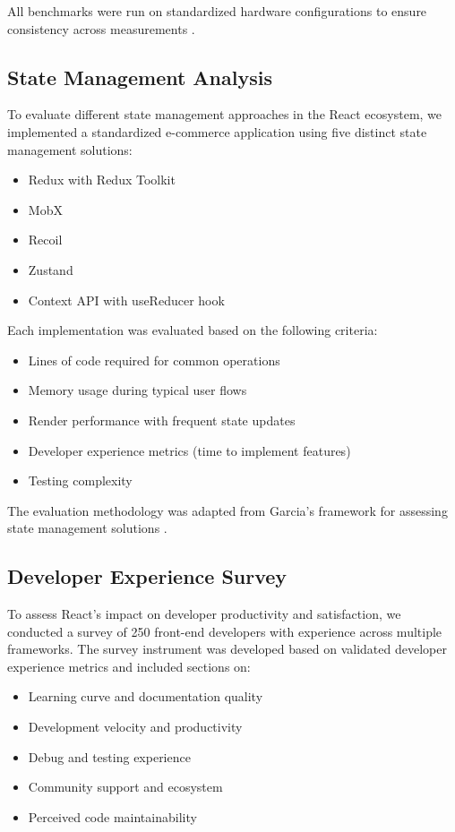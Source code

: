 All benchmarks were run on standardized hardware configurations to ensure consistency across measurements \cite{muller2020}.

\subsection{State Management Analysis}
To evaluate different state management approaches in the React ecosystem, we implemented a standardized e-commerce application using five distinct state management solutions:

\begin{itemize}
    \item Redux \cite{redux2015} with Redux Toolkit
    \item MobX \cite{mobx2016}
    \item Recoil \cite{recoil2020}
    \item Zustand \cite{zustand2019}
    \item Context API with useReducer hook
\end{itemize}

Each implementation was evaluated based on the following criteria:

\begin{itemize}
    \item Lines of code required for common operations
    \item Memory usage during typical user flows
    \item Render performance with frequent state updates
    \item Developer experience metrics (time to implement features)
    \item Testing complexity
\end{itemize}

The evaluation methodology was adapted from Garcia's framework for assessing state management solutions \cite{garcia2018}.

\subsection{Developer Experience Survey}
To assess React's impact on developer productivity and satisfaction, we conducted a survey of 250 front-end developers with experience across multiple frameworks. The survey instrument was developed based on validated developer experience metrics \cite{hassan2019} and included sections on:

\begin{itemize}
    \item Learning curve and documentation quality
    \item Development velocity and productivity
    \item Debug and testing experience
    \item Community support and ecosystem
    \item Perceived code maintainability
\end{itemize}

